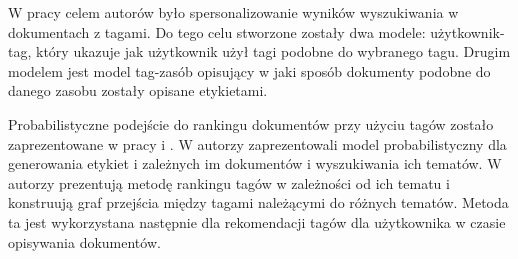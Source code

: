 W pracy \cite{conf/mir/RawashdehKE11} celem autorów było spersonalizowanie wyników wyszukiwania w dokumentach z tagami. Do tego celu stworzone zostały dwa modele: użytkownik-tag, który ukazuje jak użytkownik użył tagi podobne do wybranego tagu. Drugim modelem jest model tag-zasób opisujący w jaki sposób dokumenty podobne do danego zasobu zostały opisane etykietami. 



Probabilistyczne podejście do rankingu dokumentów przy użyciu tagów zostało zaprezentowane w pracy \cite{citeulike:2775088} i \cite{citeulike:8846111}. W \cite{citeulike:2775088} autorzy zaprezentowali model probabilistyczny dla generowania etykiet i zależnych im dokumentów i wyszukiwania ich tematów. W \cite{citeulike:8846111} autorzy prezentują metodę rankingu tagów w zależności od ich tematu i konstruują graf przejścia między tagami należącymi do różnych tematów. Metoda ta jest wykorzystana następnie dla rekomendacji tagów dla użytkownika w czasie opisywania dokumentów. 









%
%


















